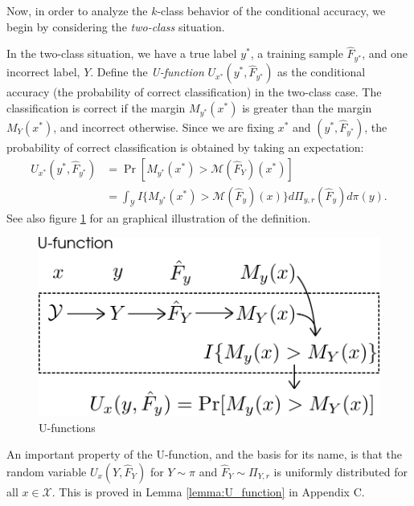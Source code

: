 Now, in order to analyze the $k$-class behavior of the conditional
accuracy, we begin by considering the \emph{two-class} situation.

In the two-class situation, we have a true label $y^*$, a training
sample $\hat{F}_{y^*}$, and one incorrect label, $Y$.  Define the
\emph{U-function} $U_{x^*}(y^*, \hat{F}_{y^*})$ as the conditional
accuracy (the probability of correct classification) in the two-class
case.  The classification is correct if the margin $M_{y^*}(x^*)$ is
greater than the margin $M_Y(x^*)$, and incorrect otherwise.  Since we
are fixing $x^*$ and $(y^*, \hat{F}_{y^*})$, the probability of
correct classification is obtained by taking an expectation:
\begin{align}\label{eq:U_function}
U_{x^*}(y^*, \hat{F}_{y^*}) &= \Pr[M_{y^*}(x^*) > \mathcal{M}(\hat{F}_Y)(x^*)]
\\&= \int_{\mathcal{Y}} 
I\{
M_{y^*}(x^*) > \mathcal{M}(\hat{F}_{y})(x)
\}
d\Pi_{y, r}(\hat{F}_y)
d\pi(y).
\end{align}
See also figure \ref{fig:U_function} for an graphical illustration of
the definition.

\begin{figure}[h]
\centering
\includegraphics[scale = 0.4]{../extrapolation_figures/U_function.png}
\caption{U-functions}\label{fig:U_function}
\end{figure}

An important property of the U-function, and the basis for its name,
is that the random variable $U_x(Y, \hat{F}_Y)$ for $Y \sim \pi$ and
$\hat{F}_Y \sim \Pi_{Y, r}$ is uniformly distributed for all
$x \in \mathcal{X}$.  This is proved in Lemma \ref{lemma:U_function}
in Appendix C.

